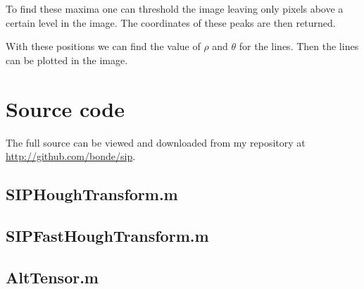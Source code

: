 \documentclass[a4paper, 10pt, final]{article}
\def\repository{\url{http://github.com/bonde/sip}}
\begin{document}
To find these maxima one can threshold the image leaving only pixels
above a certain level in the image. The coordinates of these peaks are
then returned.

With these positions we can find the value of $\rho$ and $\theta$ for
the lines. Then the lines can be plotted in the image.

\clearpage





\appendix
\lstset{language=Matlab, basicstyle=\scriptsize,
    showstringspaces=false, numbers=left, stepnumber=1,
    numberstyle=\tiny, frame=none}
\section{Source code}
The full source can be viewed and downloaded from my repository at
\repository{}.

\subsection{SIPHoughTransform.m}


\subsection{SIPFastHoughTransform.m}


\subsection{AltTensor.m}

\end{document}

